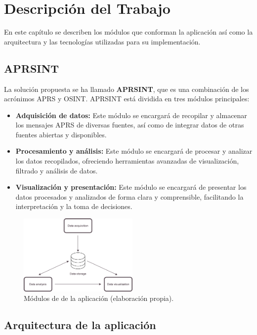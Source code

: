 \chapter{Descripción del Trabajo}
\label{cap:descripcionTrabajo}

En este capítulo se describen los módulos que conforman la aplicación así como la arquitectura y las tecnologías utilizadas para su implementación.
\section{APRSINT}
La solución propuesta se ha llamado \textbf{APRSINT}, que es una combinación de los acrónimos APRS y OSINT. APRSINT está dividida en tres módulos principales:
\begin{itemize}
	\item \textbf{Adquisición de datos:} Este módulo se encargará de recopilar y almacenar los mensajes APRS de diversas fuentes, así como de integrar datos de otras fuentes abiertas y disponibles.
	\item \textbf{Procesamiento y análisis:} Este módulo se encargará de procesar y analizar los datos recopilados, ofreciendo herramientas avanzadas de visualización, filtrado y análisis de datos.
	\item \textbf{Visualización y presentación:} Este módulo se encargará de presentar los datos procesados y analizados de forma clara y comprensible, facilitando la interpretación y la toma de decisiones.
\end{itemize}

\begin{figure}[h]
	\centering
	\includegraphics[width=0.52\textwidth]{Imagenes/Chapter_3/structure.png}
	\caption[Módulos de de la aplicación]{Módulos de de la aplicación (elaboración propia).}
	\label{fig:aprsint-logo}
\end{figure}

\FloatBarrier

\section{Arquitectura de la aplicación}

